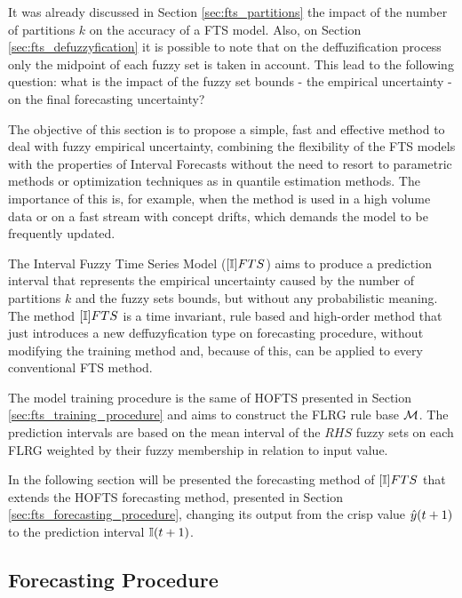 It was already discussed in Section \ref{sec:fts_partitions} the impact of the number of partitions $k$ on the accuracy of a FTS model. Also, on Section \ref{sec:fts_defuzzyfication} it is possible to note that on the deffuzification process only the midpoint of each fuzzy set is taken in account. This lead to the following question: what is the impact of the fuzzy set bounds - the empirical uncertainty - on the final forecasting uncertainty? 

The objective of this section is to propose a simple, fast and effective method to deal with fuzzy empirical uncertainty, combining the flexibility of the FTS models with the properties of Interval Forecasts without the need to resort to parametric methods or optimization techniques as in quantile estimation methods. The importance of this is, for example, when the method is used in a high volume data or on a fast stream with concept drifts, which demands the model to be frequently updated.

The Interval Fuzzy Time Series Model ($[\mathbb{I}]FTS$) aims to produce a prediction interval that represents the empirical uncertainty caused by the number of partitions $k$ and the fuzzy sets bounds, but without any probabilistic meaning. The method $[\mathbb{I}]FTS$ is a time invariant, rule based and high-order method that just  introduces a new deffuzyfication type on forecasting procedure, without modifying the training method and, because of this, can be applied to every conventional FTS method.  

The model training procedure is the same of HOFTS presented in Section \ref{sec:fts_training_procedure} and aims to construct the FLRG rule base $\mathcal{M}$. The prediction intervals are based on the mean interval of the $RHS$ fuzzy sets on each FLRG weighted by their fuzzy membership in relation to input value.

In the following section will be presented the forecasting method of $[\mathbb{I}]FTS$ that extends the HOFTS forecasting method, presented in Section \ref{sec:fts_forecasting_procedure}, changing its output from the crisp value $\hat{y}(t+1)$ to the prediction interval $\mathbb{I}(t+1)$.

%
\subsection{Forecasting Procedure} 
\label{sec:ifts_forecasting_procedure}

